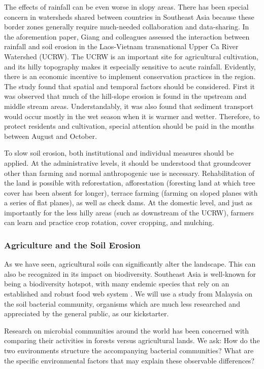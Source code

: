The effects of rainfall can be even worse in slopy areas. There has been special concern in watersheds shared between countries in Southeast Asia because these border zones generally require much-needed collaboration and data-sharing.\citep{giang2017spatial} In the aforemention paper, Giang and colleagues assessed the interaction between rainfall and soil erosion in the Laos-Vietnam transnational Upper Ca River Watershed (UCRW). The UCRW is an important site for agricultural cultivation, and its hilly topography makes it especially sensitive to acute rainfall. Evidently, there is an economic incentive to implement conservation practices in the region. The study found that spatial and temporal factors should be considered. First it was observed that much of the hill-slope erosion is found in the upstream and middle stream areas. Understandably, it was also found that sediment transport would occur mostly in the wet season when it is warmer and wetter. Therefore, to protect residents and cultivation, special attention should be paid in the months between August and October. 

To slow soil erosion, both institutional and individual measures should be applied. At the administrative levels, it should be understood that groundcover other than farming and normal anthropogenic use is necessary. Rehabilitation of the land is possible with reforestation, afforestation (foresting land at which tree cover has been absent for longer), terrace farming (farming on sloped planes with a series of flat planes), as well as check dams. At the domestic level, and just as importantly for the less hilly areas (such as downstream of the UCRW), farmers can learn and practice crop rotation, cover cropping, and mulching.

\subsubsection{Agriculture and the Soil Erosion}

As we have seen, agricultural soils can significantly alter the landscape. This can also be recognized in its impact on biodiversity. Southeast Asia is well-known for being a biodiversity hotspot, with many endemic species that rely on an established and robust food web system \citep{tripathi2012tropical}. We will use a study from Malaysia on the soil bacterial community, organisms which are much less researched and appreciated by the general public, as our kickstarter. 

Research on microbial communities around the world has been concerned with comparing their activities in forests versus agricultural lands. We ask: How do the two environments structure the accompanying bacterial communities?  What are the specific environmental factors that may explain these observable differences?

